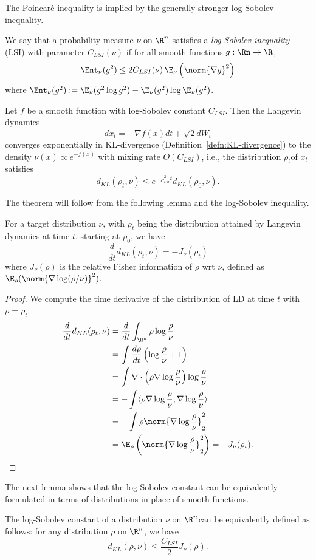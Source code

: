 The Poincar\'e inequality is implied by the generally stronger log-Sobolev
inequality.
\begin{defn}
We say that a probability measure $\nu$ on $\R^{n}$ satisfies a
\emph{log-Sobolev inequality} (LSI) with parameter $C_{LSI}(\nu)$
if for all smooth functions $g:\Rn\to\R$,
\begin{equation}
\Ent_{\nu}(g^{2})\leq2C_{LSI}(\nu)\,\E_{\nu}\left(\norm{\nabla g}^{2}\right)\label{eq:lsi}
\end{equation}
where $\Ent_{\nu}(g^{2}):=\E_{\nu}(g^{2}\log g^{2})-\E_{\nu}(g^{2})\log\E_{\nu}(g^{2})$. 
\end{defn}

\begin{thm}
\label{thm:LDinKL}Let $f$ be a smooth function with log-Sobolev
constant $C_{LSI}$. Then the Langevin dynamics 
\[
dx_{t}=-\nabla f(x)dt+\sqrt{2}dW_{t}
\]
converges exponentially in KL-divergence (Definition~\ref{defn:KL-divergence})
to the density $\nu(x)\propto e^{-f(x)}$ with mixing rate $O(C_{LSI})$,
i.e., the distribution $\rho_{t}$of $x_{t}$satisfies 
\[
d_{KL}(\rho_{t},\nu)\le e^{-\frac{2}{C_{LSI}}t}d_{KL}(\rho_{0},\nu).
\]
\end{thm}

The theorem will follow from the following lemma and the log-Sobolev
inequality.
\begin{lem}
For a target distribution $\nu$, with $\rho_{t}$ being the distribution
attained by Langevin dynamics at time $t$, starting at $\rho_{0}$,
we have
\[
\frac{d}{dt}d_{KL}(\rho_{t},\nu)=-J_{\nu}(\rho_{t})
\]
where $J_{\nu}(\rho)$ is the relative Fisher information of $\rho$
wrt $\nu$, defined as $\E_{\rho}(\norm{\nabla\log(\rho/\nu)}^{2})$.
\end{lem}

\begin{proof}
We compute the time derivative of the distribution of LD at time $t$
with $\rho=\rho_{t}$:
\begin{align*}
\frac{d}{dt}d_{KL}(\rho_{t},\nu) & =\frac{d}{dt}\int_{\R^{n}}\rho\log\frac{\rho}{\nu}\\
 & =\int\frac{d\rho}{dt}\left(\log\frac{\rho}{\nu}+1\right)\\
 & =\int\nabla\cdot\left(\rho\nabla\log\frac{\rho}{\nu}\right)\log\frac{\rho}{\nu}\\
 & =-\int\langle\rho\nabla\log\frac{\rho}{\nu},\nabla\log\frac{\rho}{\nu}\rangle\\
 & =-\int\rho\norm{\nabla\log\frac{\rho}{\nu}}_{2}^{2}\\
 & =\E_{\rho}\left(\norm{\nabla\log\frac{\rho}{\nu}}_{2}^{2}\right)=-J_{\nu}(\rho_{t}).
\end{align*}
\end{proof}
The next lemma shows that the log-Sobolev constant can be equivalently
formulated in terms of distributions in place of smooth functions.
\begin{lem}
The log-Sobolev constant of a distribution $\nu$ on $\R^{n}$can
be equivalently defined as follows: for any distribution $\rho$ on
$\R^{n}$, we have
\[
d_{KL}(\rho,\nu)\le\frac{C_{LSI}}{2}J_{\nu}(\rho).
\]
\end{lem}


